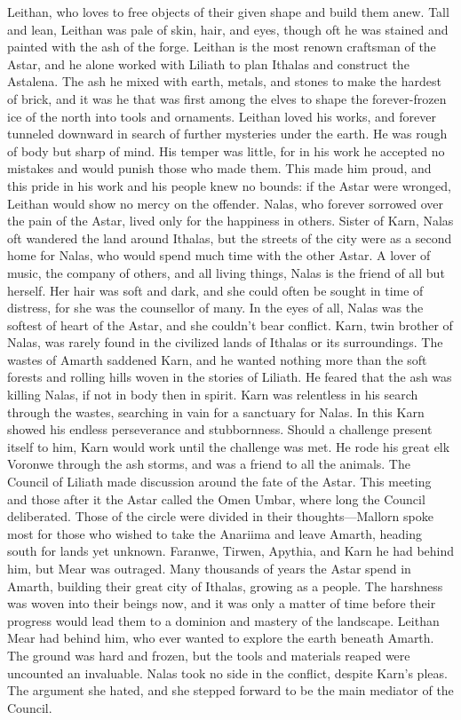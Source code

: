 \documentclass[smalldemyvopaper,11pt,twoside,onecolumn,openright,extrafontsizes]{memoir}
\begin{document}
{{Leithan, who loves to free objects of their given shape and build them anew. Tall and lean, Leithan was pale of skin, hair, and eyes, though oft he was stained and painted with the ash of the forge. Leithan is the most renown craftsman of the Astar, and he alone worked with Liliath to plan Ithalas and construct the Astalena. The ash he mixed with earth, metals, and stones to make the hardest of brick, and it was he that was first among the elves to shape the forever-frozen ice of the north into tools and ornaments. Leithan loved his works, and forever tunneled downward in search of further mysteries under the earth. He was rough of body but sharp of mind. His temper was little, for in his work he accepted no mistakes and would punish those who made them. This made him proud, and this pride in his work and his people knew no bounds: if the Astar were wronged, Leithan would show no mercy on the offender.
Nalas, who forever sorrowed over the pain of the Astar, lived only for the happiness in others. Sister of Karn, Nalas oft wandered the land around Ithalas, but the streets of the city were as a second home for Nalas, who would spend much time with the other Astar. A lover of music, the company of others, and all living things, Nalas is the friend of all but herself. Her hair was soft and dark, and she could often be sought in time of distress, for she was the counsellor of many. In the eyes of all, Nalas was the softest of heart of the Astar, and she couldn’t bear conflict.
Karn, twin brother of Nalas, was rarely found in the civilized lands of Ithalas or its surroundings. The wastes of Amarth saddened Karn, and he wanted nothing more than the soft forests and rolling hills woven in the stories of Liliath. He feared that the ash was killing Nalas, if not in body then in spirit. Karn was relentless in his search through the wastes, searching in vain for a sanctuary for Nalas. In this Karn showed his endless perseverance and stubbornness. Should a challenge present itself to him, Karn would work until the challenge was met.  He rode his great elk Voronwe through the ash storms, and was a friend to all the animals.
The Council of Liliath made discussion around the fate of the Astar. This meeting and those after it the Astar called the Omen Umbar, where long the Council deliberated. Those of the circle were divided in their thoughts—Mallorn spoke most for those who wished to take the Anariima and leave Amarth, heading south for lands yet unknown. Faranwe, Tirwen, Apythia, and Karn he had behind him, but Mear was outraged. Many thousands of years the Astar spend in Amarth, building their great city of Ithalas, growing as a people. The harshness was woven into their beings now, and it was only a matter of time before their progress would lead them to a dominion and mastery of the landscape. Leithan Mear had behind him, who ever wanted to explore the earth beneath Amarth. The ground was hard and frozen, but the tools and materials reaped were uncounted an invaluable. Nalas took no side in the conflict, despite Karn’s pleas. The argument she hated, and she stepped forward to be the main mediator of the Council.
}}
\end{document}
